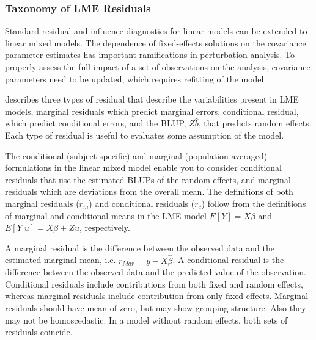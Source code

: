 \documentclass[12pt, a4paper]{report}
\theoremstyle{definition}
\theoremstyle{remark}
\begin{document}



\subsubsection{Taxonomy of LME Residuals}
Standard residual and influence diagnostics for linear models can
be extended to linear mixed models. The dependence of
fixed-effects solutions on the covariance parameter estimates has
important ramifications in perturbation analysis. To properly assess the
full impact of a set of observations on the analysis, covariance
parameters need to be updated, which requires refitting of the
model.

\citet{PB} describes three types of residual that describe the variabilities
present in LME models, marginal residuals which predict marginal errors, conditional residual, which predict conditional errors, and the BLUP, $ {Z\hat{b}}$, that predicts random effects. Each type of residual is useful to evaluates some assumption of the model.

The conditional (subject-specific) and marginal (population-averaged) formulations in the linear mixed model enable you to consider conditional residuals that use the estimated BLUPs of the random effects, and marginal residuals which are deviations from the overall mean. The definitions of both marginal residuals ($r_m$) and conditional residuals ($r_c$) follow from the definitions of marginal and conditional means in the LME model 
$E[{Y}] = {X}{\beta}$ and $E[{Y|{u}}] = {X}{\beta} + {Z}{u}$, respectively.

A marginal residual is the difference between the observed data and the estimated marginal mean, i.e. $r_{Mar} = y - X \hat{\beta}$. A conditional residual is the difference between the observed data and the predicted value of the observation. 
 Conditional residuals include contributions from both fixed and random effects, whereas marginal residuals include contribution from only fixed effects. Marginal residuals should have mean of zero, but may show grouping structure. Also they may not be homoscedastic. In a model without random effects, both sets of residuals coincide.
\end{document}
